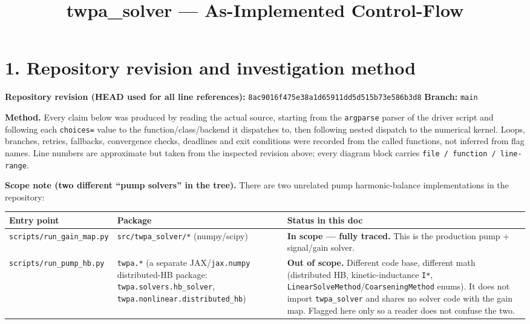 \documentclass[
  10pt,
]{article}
\title{twpa\_solver --- As-Implemented Control-Flow}
\author{}
\date{}
\newcounter{none} %
\begin{document}
\maketitle

{
\setcounter{tocdepth}{2}
\tableofcontents
}
\section{1. Repository revision and investigation
method}\label{repository-revision-and-investigation-method}

\textbf{Repository revision (HEAD used for all line references):}
\texttt{8ac9016f475e38a1d65911dd5d515b73e586b3d8} \textbf{Branch:}
\texttt{main}

\textbf{Method.} Every claim below was produced by reading the actual
source, starting from the \texttt{argparse} parser of the driver script
and following each \texttt{choices=} value to the function/class/backend
it dispatches to, then following nested dispatch to the numerical
kernel. Loops, branches, retries, fallbacks, convergence checks,
deadlines and exit conditions were recorded from the called functions,
not inferred from flag names. Line numbers are approximate but taken
from the inspected revision above; every diagram block carries
\texttt{file\ /\ function\ /\ line-range}.

\textbf{Scope note (two different ``pump solvers'' in the tree).} There
are two unrelated pump harmonic-balance implementations in the
repository:

{\def\LTcaptype{none} %
\begin{longtable}[]{@{}
  >{\raggedright\arraybackslash}p{}
  >{\raggedright\arraybackslash}p{}
  >{\raggedright\arraybackslash}p{}@{}}
\toprule\noalign{}
\begin{minipage}[b]{\linewidth}\raggedright
Entry point
\end{minipage} & \begin{minipage}[b]{\linewidth}\raggedright
Package
\end{minipage} & \begin{minipage}[b]{\linewidth}\raggedright
Status in this doc
\end{minipage} \\
\midrule\noalign{}
\endhead
\bottomrule\noalign{}
\endlastfoot
\texttt{scripts/run\_gain\_map.py} & \texttt{src/twpa\_solver/*}
(numpy/scipy) & \textbf{In scope --- fully traced.} This is the
production pump + signal/gain solver. \\
\texttt{scripts/run\_pump\_hb.py} & \texttt{twpa.*} (a separate
JAX/\texttt{jax.numpy} distributed-HB package:
\texttt{twpa.solvers.hb\_solver},
\texttt{twpa.nonlinear.distributed\_hb}) & \textbf{Out of scope.}
Different code base, different math (distributed HB, kinetic-inductance
\texttt{I*}, \texttt{LinearSolveMethod}/\texttt{CoarseningMethod}
enums). It does not import \texttt{twpa\_solver} and shares no solver
code with the gain map. Flagged here only so a reader does not confuse
the two. \\
\end{longtable}
}
\end{document}
